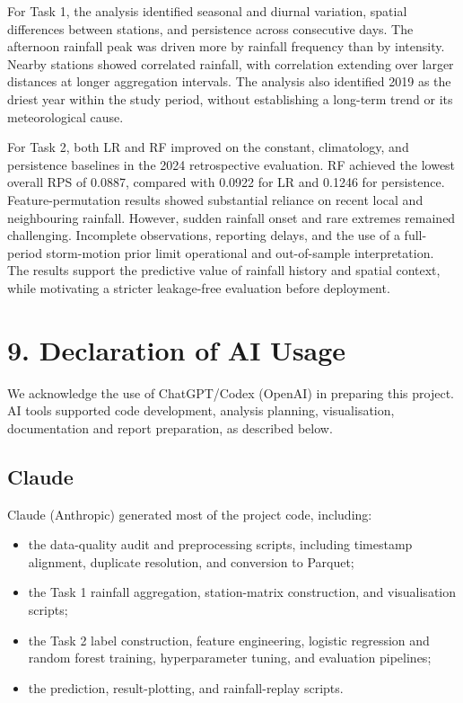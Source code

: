 \documentclass[11pt,a4paper]{article}
\begin{document}
For Task 1, the analysis identified seasonal and diurnal variation, spatial differences between stations, and persistence across consecutive days. The afternoon rainfall peak was driven more by rainfall frequency than by intensity. Nearby stations showed correlated rainfall, with correlation extending over larger distances at longer aggregation intervals. The analysis also identified 2019 as the driest year within the study period, without establishing a long-term trend or its meteorological cause.


For Task 2, both LR and RF improved on the constant, climatology, and persistence baselines in the 2024 retrospective evaluation. RF achieved the lowest overall RPS of 0.0887, compared with 0.0922 for LR and 0.1246 for persistence. Feature-permutation results showed substantial reliance on recent local and neighbouring rainfall. However, sudden rainfall onset and rare extremes remained challenging. Incomplete observations, reporting delays, and the use of a full-period storm-motion prior limit operational and out-of-sample interpretation. The results support the predictive value of rainfall history and spatial context, while motivating a stricter leakage-free evaluation before deployment.


\clearpage

\section*{9. Declaration of AI Usage}
{}


We acknowledge the use of ChatGPT/Codex (OpenAI) in preparing this project. AI tools supported code development, analysis planning, visualisation, documentation and report preparation, as described below.

\subsection*{Claude}

Claude (Anthropic) generated most of the project code, including:
\begin{itemize}
    \item the data-quality audit and preprocessing scripts, including timestamp alignment, duplicate resolution, and conversion to Parquet;
    \item the Task 1 rainfall aggregation, station-matrix construction, and visualisation scripts;
    \item the Task 2 label construction, feature engineering, logistic regression and random forest training, hyperparameter tuning, and evaluation pipelines;
    \item the prediction, result-plotting, and rainfall-replay scripts.
\end{itemize}
\end{document}
